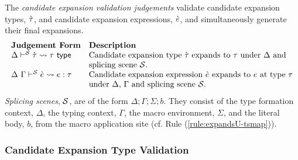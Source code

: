 The \emph{candidate expansion validation judgements} validate candidate expansion types, $\grave{\tau}$, and candidate expansion expressions, $\grave{e}$, and simultaneously generate their final expansions.
\[\begin{array}{ll}
\textbf{Judgement Form} & \textbf{Description}\\
\Delta\vdash^{\mathcal{S}} \grave{\tau} \leadsto \tau~\mathsf{type} & \text{Candidate expansion type $\grave{\tau}$ expands to $\tau$ under $\Delta$ and }\\
& \text{splicing scene $\mathcal{S}$.}\\
\Delta~\Gamma\vdash^{\mathcal{S}} \grave{e} \leadsto e : \tau & \text{Candidate expansion expression $\grave{e}$ expands to $e$ at type $\tau$}\\
& \text{under $\Delta$, $\Gamma$ and splicing scene $\mathcal{S}$.}
\end{array}\]
\emph{Splicing scenes}, $\mathcal{S}$, are of the form $\Delta; \Gamma; \Sigma; b$. They consist of the type formation context, $\Delta$, the typing context, $\Gamma$, the macro environment, $\Sigma$, and the literal body, $b$, from the macro application site (cf. Rule (\ref{rule:expandsU-tsmap})).

\subsubsection{Candidate Expansion Type Validation}

